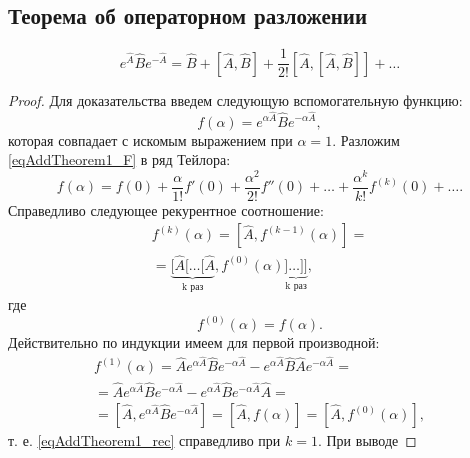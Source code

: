\subsection{Теорема об операторном разложении}
\begin{theorem}
\label{thm:addoperatorequality}
\begin{equation}
e^{\hat{A}}\hat{B}e^{-\hat{A}} = 
\hat{B} + \left[\hat{A},\hat{B}\right] + 
\frac{1}{2!} \left[\hat{A},\left[\hat{A},\hat{B}\right]\right] + \dots
\label{eqAddTheorem1_Main}
\end{equation}
\begin{proof}
Для доказательства введем следующую вспомогательную функцию:
\begin{equation}
f\left(\alpha\right) = 
e^{\alpha\hat{A}}\hat{B}e^{-\alpha\hat{A}},
\label{eqAddTheorem1_F}
\end{equation}
которая совпадает с искомым выражением при $\alpha = 1$. Разложим
\eqref{eqAddTheorem1_F} в ряд Тейлора:
\begin{equation}
f\left(\alpha\right) = 
f\left(0\right) + \frac{\alpha}{1!}f'\left(0\right) +
\frac{\alpha^2}{2!}f''\left(0\right) + 
\dots +
\frac{\alpha^k}{k!}f^{(k)}\left(0\right) + \dots.
\label{eqAddTheorem1_T}
\end{equation}
Справедливо следующее рекурентное соотношение:
\begin{eqnarray}
f^{(k)}\left(\alpha\right) = \left[\hat{A},
  f^{(k-1)}\left(\alpha\right)\right] = 
\nonumber \\
=
\underbrace{
[\hat{A}[\dots[\hat{A}}_{\mbox{k
  раз}},
f^{(0)}\left(\alpha\right)
\underbrace{]\dots]]}_{\mbox{k
  раз}},
\label{eqAddTheorem1_rec}
\end{eqnarray}
где 
\[
f^{(0)}\left(\alpha\right) = f\left(\alpha\right).
\]
Действительно по индукции имеем для первой производной:
\begin{eqnarray}
f^{(1)}\left(\alpha\right) = \hat{A}
  e^{\alpha\hat{A}}\hat{B}e^{-\alpha\hat{A}} -
  e^{\alpha\hat{A}}\hat{B}\hat{A}e^{-\alpha\hat{A}} = 
\nonumber \\
= \hat{A}
  e^{\alpha\hat{A}}\hat{B}e^{-\alpha\hat{A}} -
  e^{\alpha\hat{A}}\hat{B}e^{-\alpha\hat{A}}\hat{A} = 
\nonumber \\
=
\left[\hat{A}, e^{\alpha\hat{A}}\hat{B}e^{-\alpha\hat{A}}\right] = 
\left[\hat{A}, f\left(\alpha\right)\right] = 
\left[\hat{A}, f^{(0)}\left(\alpha\right)\right],
\label{eqAddTheorem1_rec_1}
\end{eqnarray}
т. е. \eqref{eqAddTheorem1_rec} справедливо при $k = 1$. При выводе

\end{proof}
\end{theorem}
